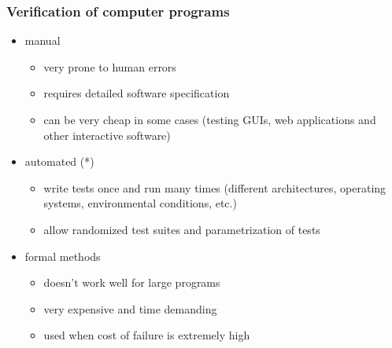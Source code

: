 \documentclass{beamer}
\begin{document}
\begin{frame}[fragile]
    \frametitle{Verification of computer programs}

    \begin{itemize}
        \item manual
            \begin{itemize}
                \item very prone to human errors
                \item requires detailed software specification
                \item can be very cheap in some cases (testing GUIs, web applications
                and other interactive software)
            \end{itemize}
        \pause
        \item automated (*)
            \begin{itemize}
                \item write tests once and run many times (different architectures,
                operating systems, environmental conditions, etc.)
                \item allow randomized test suites and parametrization of tests
            \end{itemize}
        \pause
        \item formal methods
            \begin{itemize}
                \item doesn't work well for large programs
                \item very expensive and time demanding
                \item used when cost of failure is extremely high
            \end{itemize}
    \end{itemize}
\end{frame}

\end{document}
